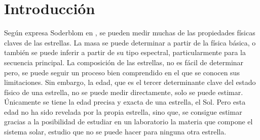 
\chapter{Introducción} 
\label{sec:intro}
 
Según expresa Soderblom en \cite{Soderblom10}, se pueden medir muchas de las propiedades físicas claves de las estrellas. La masa se puede determinar a partir de la física básica, o también se puede inferir a partir de su tipo espectral, particularmente para la secuencia principal. La composición de las estrellas, no es fácil de determinar pero, se puede seguir un proceso bien comprendido en el que se conocen sus limitaciones. Sin embargo, la edad, que es el tercer determinante clave del estado físico de una estrella, no se puede medir directamente, solo se puede estimar. Únicamente se tiene la edad precisa y exacta de una estrella, el Sol. Pero esta edad no ha sido revelada por la propia estrella, sino que, se consigue estimar gracias a la posibilidad de estudiar en un laboratorio la materia que compone el sistema solar, estudio que no se puede hacer para ninguna otra estrella.


